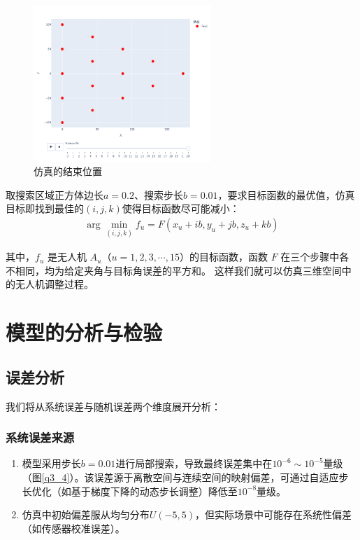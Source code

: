 \documentclass[withoutpreface,bwprint]{cumcmthesis} %
\begin{document}
\begin{figure}[H]
    \centering
    \includegraphics[width=0.6\textwidth]{../../figure/end_4.png} 
    \caption{仿真的结束位置}
    \label{q4_2}    
\end{figure}

取搜索区域正方体边长\( a = 0.2 \)、搜索步长\( b = 0.01 \)，要求目标函数的最优值，仿真目标即找到最佳的\( (i,j,k) \)使得目标函数尽可能减小：
\begin{align}
    \arg\min\limits_{(i,j,k)} f_u = F(x_u + ib, y_u + jb, z_u + kb)
\end{align}


其中，\( f_u \) 是无人机 \( A_u \)（\( u = 1,2,3,\cdots,15 \)）的目标函数，函数 \( F \) 在三个步骤中各不相同，均为给定夹角与目标角误差的平方和。
这样我们就可以仿真三维空间中的无人机调整过程。



\section{模型的分析与检验}
\subsection{误差分析}
我们将从系统误差与随机误差两个维度展开分析：

\subsubsection{系统误差来源}


\begin{enumerate}
    \item 模型采用步长$b=0.01$进行局部搜索，导致最终误差集中在$10^{-6} \sim 10^{-5}$量级（图\ref{q3_4}）。该误差源于离散空间与连续空间的映射偏差，可通过自适应步长优化（如基于梯度下降的动态步长调整）降低至$10^{−8}$量级。
    \item ​仿真中初始偏差服从均匀分布$U(−5,5)$，但实际场景中可能存在系统性偏差（如传感器校准误差）。
    
\end{enumerate}
\end{document}
